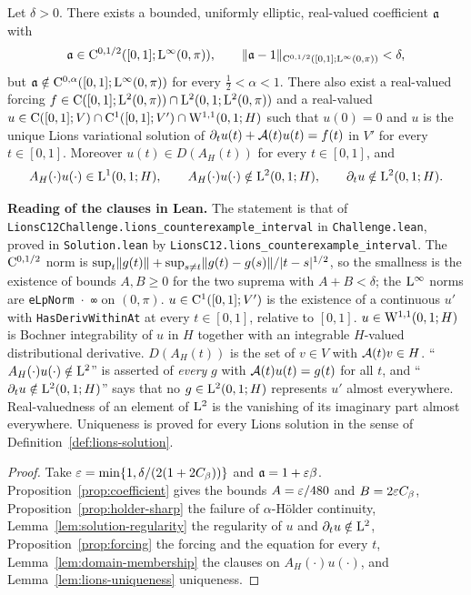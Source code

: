 \begin{theorem}
  \label{thm:main}
  \leanok
  Let $\delta>0$.  There exists a bounded, uniformly elliptic, real-valued coefficient $\mathfrak{a}$ with
  \[
    \mathfrak{a}\in\mathrm{C}^{0,1/2}([0,1];\mathrm{L}^\infty(0,\pi)),\qquad
    \lVert \mathfrak{a}-1\rVert_{\mathrm{C}^{0,1/2}([0,1];\mathrm{L}^\infty(0,\pi))}<\delta,
  \]
  but $\mathfrak{a}\notin\mathrm{C}^{0,\alpha}([0,1];\mathrm{L}^\infty(0,\pi))$ for every $\frac12<\alpha<1$.  There also
  exist a real-valued forcing $f\in\mathrm{C}([0,1];\mathrm{L}^2(0,\pi))\cap\mathrm{L}^2(0,1;\mathrm{L}^2(0,\pi))$ and a
  real-valued $u\in\mathrm{C}([0,1];V)\cap\mathrm{C}^1([0,1];V')\cap\mathrm{W}^{1,1}(0,1;H)$ such that $u(0)=0$ and $u$
  is the unique Lions variational solution of $\partial_tu(t)+\mathcal{A}(t)u(t)=f(t)$ in $V'$ for every
  $t\in[0,1]$.  Moreover $u(t)\in D(A_H(t))$ for every $t\in[0,1]$, and
  \[
    A_H(\cdot)u(\cdot)\in\mathrm{L}^1(0,1;H),\qquad A_H(\cdot)u(\cdot)\notin\mathrm{L}^2(0,1;H),\qquad
    \partial_tu\notin\mathrm{L}^2(0,1;H).
  \]
\end{theorem}

\textbf{Reading of the clauses in Lean.}  The statement is that of
\texttt{LionsC12Challenge.lions\_counterexample\_interval} in \texttt{Challenge.lean}, proved in
\texttt{Solution.lean} by \texttt{LionsC12.lions\_counterexample\_interval}.  The $\mathrm{C}^{0,1/2}$ norm is
$\sup_t\lVert g(t)\rVert+\sup_{s\neq t}\lVert g(t)-g(s)\rVert/\lvert t-s\rvert^{1/2}$, so the smallness is the
existence of bounds $A,B\geq0$ for the two suprema with $A+B<\delta$; the $\mathrm{L}^\infty$ norms
are \texttt{eLpNorm $\cdot$ ∞} on $(0,\pi)$.  $u\in\mathrm{C}^1([0,1];V')$ is the existence of a
continuous $u'$ with \texttt{HasDerivWithinAt} at every $t\in[0,1]$, relative to $[0,1]$.
$u\in\mathrm{W}^{1,1}(0,1;H)$ is Bochner integrability of $u$ in $H$ together with an integrable
$H$-valued distributional derivative.  $D(A_H(t))$ is the set of $v\in V$ with $\mathcal{A}(t)v\in H$.
``$A_H(\cdot)u(\cdot)\notin\mathrm{L}^2$'' is asserted of \emph{every} $g$ with
$\mathcal{A}(t)u(t)=g(t)$ for all $t$, and ``$\partial_tu\notin\mathrm{L}^2(0,1;H)$'' says that no
$g\in\mathrm{L}^2(0,1;H)$ represents $u'$ almost everywhere.  Real-valuedness of an element of
$\mathrm{L}^2$ is the vanishing of its imaginary part almost everywhere.  Uniqueness is proved for
every Lions solution in the sense of Definition~\ref{def:lions-solution}.

\begin{proof}
  \leanok
  Take $\varepsilon=\min\{1,\delta/(2(1+2C_\beta))\}$ and $\mathfrak{a}=1+\varepsilon\beta$.
  Proposition~\ref{prop:coefficient} gives the bounds $A=\varepsilon/480$ and
  $B=2\varepsilon C_\beta$, Proposition~\ref{prop:holder-sharp} the failure of $\alpha$-H\"older
  continuity, Lemma~\ref{lem:solution-regularity} the regularity of $u$ and
  $\partial_tu\notin\mathrm{L}^2$, Proposition~\ref{prop:forcing} the forcing and the equation for
  every $t$, Lemma~\ref{lem:domain-membership} the clauses on $A_H(\cdot)u(\cdot)$, and
  Lemma~\ref{lem:lions-uniqueness} uniqueness.
\end{proof}

